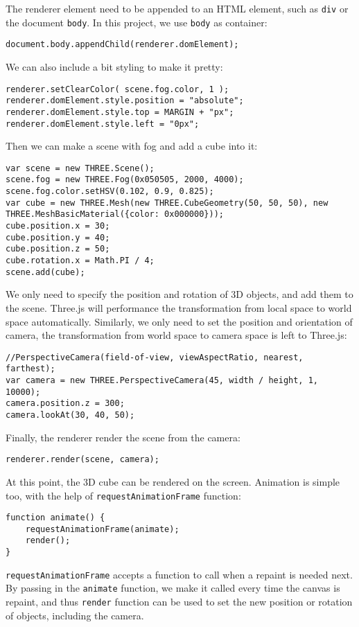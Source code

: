 The renderer element need to be appended to an HTML element, such as \texttt{div} or the document \texttt{body}. In this project, we use \texttt{body} as container:
\begin{lstlisting}
document.body.appendChild(renderer.domElement);
\end{lstlisting}

We can also include a bit styling to make it pretty:
\begin{lstlisting}
renderer.setClearColor( scene.fog.color, 1 );
renderer.domElement.style.position = "absolute";
renderer.domElement.style.top = MARGIN + "px";
renderer.domElement.style.left = "0px";
\end{lstlisting}

Then we can make a scene with fog and add a cube into it: 
\begin{lstlisting}
var scene = new THREE.Scene();
scene.fog = new THREE.Fog(0x050505, 2000, 4000);
scene.fog.color.setHSV(0.102, 0.9, 0.825);
var cube = new THREE.Mesh(new THREE.CubeGeometry(50, 50, 50), new THREE.MeshBasicMaterial({color: 0x000000}));
cube.position.x = 30;
cube.position.y = 40;
cube.position.z = 50;
cube.rotation.x = Math.PI / 4;
scene.add(cube);
\end{lstlisting}

We only need to specify the position and rotation of 3D objects, and add them to the scene. Three.js will performance the transformation from local space to world space automatically. Similarly, we only need to set the position and orientation of camera, the transformation from world space to camera space is left to Three.js:
\begin{lstlisting}
//PerspectiveCamera(field-of-view, viewAspectRatio, nearest, farthest);
var camera = new THREE.PerspectiveCamera(45, width / height, 1, 10000);
camera.position.z = 300;
camera.lookAt(30, 40, 50);
\end{lstlisting}

Finally, the renderer render the scene from the camera:
\begin{lstlisting}
renderer.render(scene, camera);
\end{lstlisting}

At this point, the 3D cube can be rendered on the screen. Animation is simple too, with the help of \texttt{requestAnimationFrame} function:
\begin{lstlisting}
function animate() {
	requestAnimationFrame(animate);
	render();
}
\end{lstlisting}

\texttt{requestAnimationFrame} accepts a function to call when a repaint is needed next. By passing in the \texttt{animate} function, we make it called every time the canvas is repaint, and thus \texttt{render} function can be used to set the new position or rotation of objects, including the camera.


